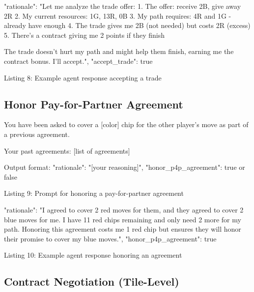 \documentclass{article} %
\begin{document}
\begin{promptbox}
{
  "rationale": "Let me analyze the trade offer:
  1. The offer: receive 2B, give away 2R
  2. My current resources: 1G, 13R, 0B
  3. My path requires: 4R and 1G - already have enough
  4. The trade gives me 2B (not needed) but costs 2R (excess)
  5. There's a contract giving me 2 points if they finish

  The trade doesn't hurt my path and might help them finish,
  earning me the contract bonus. I'll accept.",
  "accept_trade": true
}
\end{promptbox}
\vspace{-8pt}
\begin{center}\small Listing 8: Example agent response accepting a trade\end{center}

\subsection{Honor Pay-for-Partner Agreement}

\begin{promptbox}

You have been asked to cover a [color] chip for the other player's move as part of a previous agreement.

Your past agreements: [list of agreements]

Output format:
{
  "rationale": "[your reasoning]",
  "honor_p4p_agreement": true or false
}
\end{promptbox}
\vspace{-8pt}
\begin{center}\small Listing 9: Prompt for honoring a pay-for-partner agreement\end{center}

\begin{promptbox}
{
  "rationale": "I agreed to cover 2 red moves for them, and
  they agreed to cover 2 blue moves for me. I have 11 red
  chips remaining and only need 2 more for my path. Honoring
  this agreement costs me 1 red chip but ensures they will
  honor their promise to cover my blue moves.",
  "honor_p4p_agreement": true
}
\end{promptbox}
\vspace{-8pt}
\begin{center}\small Listing 10: Example agent response honoring an agreement\end{center}

\subsection{Contract Negotiation (Tile-Level)}
\end{document}

